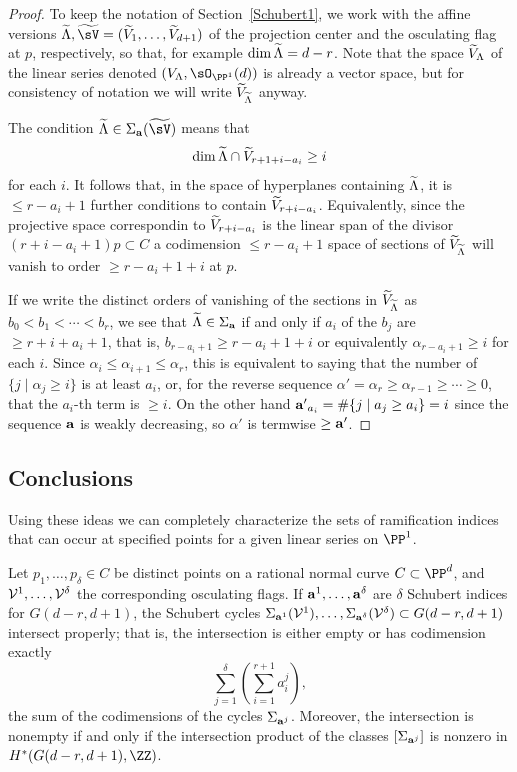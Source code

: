 \begin{proof}
To keep the notation of Section~\ref{Schubert1}, we work with the affine versions
$\tL, \tsV = (\tV_1, \dots, \tV_{d+1})$ of the projection center and the osculating flag at $p$, respectively,
so that, for example $\dim \tL = d-r$. Note that the space $\tV_\Lambda$ of the linear series 
denoted $(V_\Lambda, \sO_{\PP^1}(d))$ 
is already a vector space, but for consistency of notation we will write $\tV_\tL$ anyway.

The condition $\tL \in \Sigma_{\bf a}({\tsV})$
 means that 
$$
\dim \tL \cap \tV_{r+1+i-a_i} \geq i
$$
for each $i$. It follows that, 
in the space of hyperplanes containing $\tL$, it is $\leq r-a_i+1$ further conditions to contain $\tV_{r+i-a_i}$. Equivalently,
since the projective space correspondin to $\tV_{r+i-a_i}$ is the linear span of the divisor $(r+i-a_i+1)p\subset C$
a codimension $\leq r-a_i+1$ space of sections of $\tV_\tL$ will vanish to order $\geq r -a_i+1+i$ at $p$. 

If we write the distinct orders of vanishing of the sections in $\tV_\tL$ as
$b_0 < b_1<  \cdots < b_r$, we see that $\tL \in \Sigma_{\bf a}$  if and only if
$a_i$ of the $b_j$ are $\geq r+i+a_i+1$, that is,
$b_{r-a_i+1}\geq r-a_i+1+i$ or equivalently $\alpha_{r-a_i+1}\geq i$ for each $i$.
Since $\alpha_i\leq \alpha_{i+1} \leq \alpha_r$,
this is equivalent to saying that the number of $\{j \mid \alpha_j \geq i\}$ is at least $a_i$, or, for the
reverse sequence $\alpha' = \alpha_r \geq \alpha_{r-1} \geq \cdots \geq 0$, that the $a_i$-th term is $\geq i$.
On the other hand ${\bf a'}_{a_i} = \#\{j\mid a_j \geq a_i\} = i$ since the sequence ${\bf a}$ is weakly
decreasing, so $\alpha'$ is termwise $\geq {\bf a'}$.
\end{proof}

\subsection{Conclusions}

Using these ideas we can completely characterize the sets of ramification indices that can occur at specified points for a given
linear series on $\PP^1$. 

\begin{theorem}\label{osculating intersection}
Let $p_1,\dots,p_\delta \in C$ be distinct points on a rational normal curve $C \subset \PP^d$, and ${\cal V}^1, \dots, {\cal V}^\delta$ the corresponding osculating flags. If ${\bf a}^1, \dots, {\bf a}^\delta$ are $\delta$ Schubert indices for $G(d-r, d+1)$, the Schubert cycles $\Sigma_{{\bf a}^1}({\cal V}^1), \dots, \Sigma_{{\bf a}^\delta}({\cal V}^\delta) \subset G(d-r, d+1)$ intersect properly; that is, the intersection is either empty or has codimension exactly
$$
\sum_{j=1}^\delta\left(\sum_{i = 1}^{r+1}a^j_i\right),
$$
 the sum of the codimensions of the cycles $\Sigma_{{\bf a}^j}$. Moreover, the intersection is nonempty if and only if
 the intersection product of the classes $[\Sigma_{{\bf a}^j}]$ is nonzero in $H^*(G(d-r, d+1), \ZZ)$.
\end{theorem}

